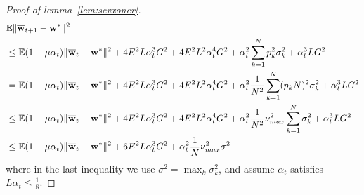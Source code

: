 \begin{proof}[Proof of lemma~\ref{lem:scvxoner}]
	\begin{align*}
	& \mathbb{E}\|{\overline{\mathbf{w}}}_{t+1}-{\mathbf{w}}^{\ast}\|^{2}\\
	& \leq\mathbb{E}(1-\mu\alpha_{t})\|{\overline{\mathbf{w}}}_{t}-{\mathbf{w}}^{\ast}\|^{2}+4E^{2}L\alpha_{t}^{3}G^{2}+4E^{2}L^{2}\alpha_{t}^{4}G^{2}+\alpha_{t}^{2}\sum_{k=1}^{N}p_{k}^{2}\sigma_{k}^{2}+\alpha_{t}^{3}LG^{2}\\
	& =\mathbb{E}(1-\mu\alpha_{t})\|{\overline{\mathbf{w}}}_{t}-{\mathbf{w}}^{\ast}\|^{2}+4E^{2}L\alpha_{t}^{3}G^{2}+4E^{2}L^{2}\alpha_{t}^{4}G^{2}+\alpha_{t}^{2}\frac{1}{N^{2}}\sum_{k=1}^{N}(p_{k}N)^{2}\sigma_{k}^{2}+\alpha_{t}^{3}LG^{2}\\
	& \leq\mathbb{E}(1-\mu\alpha_{t})\|{\overline{\mathbf{w}}}_{t}-{\mathbf{w}}^{\ast}\|^{2}+4E^{2}L\alpha_{t}^{3}G^{2}+4E^{2}L^{2}\alpha_{t}^{4}G^{2}+\alpha_{t}^{2}\frac{1}{N^{2}}\nu_{max}^{2}\sum_{k=1}^{N}\sigma_{k}^{2}+\alpha_{t}^{3}LG^{2}\\
	& \leq\mathbb{E}(1-\mu\alpha_{t})\|{\overline{\mathbf{w}}}_{t}-{\mathbf{w}}^{\ast}\|^{2}+6E^{2}L\alpha_{t}^{3}G^{2}+\alpha_{t}^{2}\frac{1}{N}\nu_{max}^{2}\sigma^{2}
	\end{align*}
	where in the last inequality we use $\sigma^{2}=\max_{k}\sigma_{k}^{2}$, and assume $\alpha_{t}$
	satisfies $L\alpha_{t}\leq\frac{1}{8}$. 

\end{proof}


